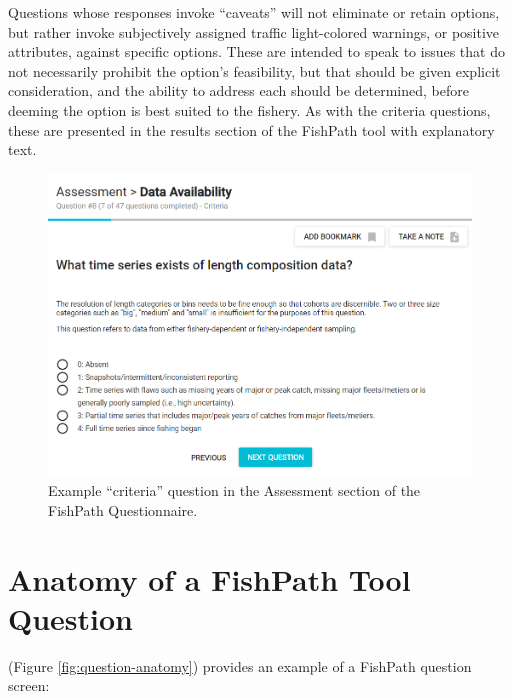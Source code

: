 \documentclass[
  11pt,
]{book}
\begin{document}
Questions whose responses invoke ``caveats'' will not eliminate or retain options, but rather invoke subjectively assigned traffic light-colored warnings, or positive attributes, against specific options. These are intended to speak to issues that do not necessarily prohibit the option's feasibility, but that should be given explicit consideration, and the ability to address each should be determined, before deeming the option is best suited to the fishery. As with the criteria questions, these are presented in the results section of the FishPath tool with explanatory text.

\begin{figure}
 
 {\centering \includegraphics[width=0.95\linewidth]{images/ex-crit-question} 
 
 }
 
 \caption{Example “criteria” question in the Assessment section of the FishPath Questionnaire.}\label{fig:ex-crit-question}
 \end{figure}

\hypertarget{anatomy-of-a-fishpath-tool-question}{%
\section{Anatomy of a FishPath Tool Question}\label{anatomy-of-a-fishpath-tool-question}}

(Figure \ref{fig:question-anatomy}) provides an example of a FishPath question screen:
\end{document}
